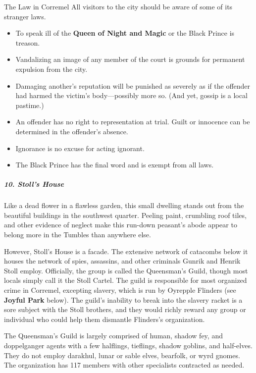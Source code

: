 \documentclass[10pt,a4paper,twoside,bg=print,twocolumn,openany,nodeprecatedcode]{dndbook}
\begin{document}
\begin{DndSidebar}[float=!b]{The Law in Corremel}
All visitors to the city should be aware of some of its stranger laws.




\begin{itemize}
\item To speak ill of the \textbf{Queen of Night and Magic} or the Black Prince is treason.
\item Vandalizing an image of any member of the court is grounds for permanent expulsion from the city.
\item Damaging another's reputation will be punished as severely as if the offender had harmed the victim's body—possibly more so. (And yet, gossip is a local pastime.)
\item An offender has no right to representation at trial. Guilt or innocence can be determined in the offender's absence.
\item Ignorance is no excuse for acting ignorant.
\item The Black Prince has the final word and is exempt from all laws.
\end{itemize}



\end{DndSidebar}

\subparagraph{10. Stoll's House}
Like a dead flower in a flawless garden, this small dwelling stands out from the beautiful buildings in the southwest quarter. Peeling paint, crumbling roof tiles, and other evidence of neglect make this run-down peasant's abode appear to belong more in the Tumbles than anywhere else.

However, Stoll's House is a facade. The extensive network of catacombs below it houses the network of spies, assassins, and other criminals Gunrik and Henrik Stoll employ. Officially, the group is called the Queensman's Guild, though most locals simply call it the Stoll Cartel. The guild is responsible for most organized crime in Corremel, excepting slavery, which is run by Oyrepple Flinders (see \textbf{Joyful Park} below). The guild's inability to break into the slavery racket is a sore subject with the Stoll brothers, and they would richly reward any group or individual who could help them dismantle Flinders's organization.

The Queensman's Guild is largely comprised of human, shadow fey, and doppelganger agents with a few halflings, tieflings, shadow goblins, and half-elves. They do not employ darakhul, lunar or sable elves, bearfolk, or wyrd gnomes. The organization has 117 members with other specialists contracted as needed.
\end{document}
